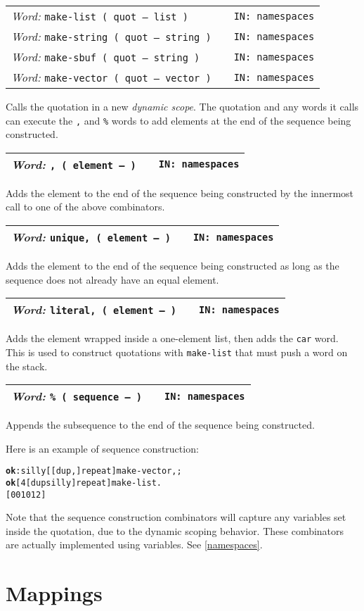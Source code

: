 \documentclass{report}
\newcommand{\tto}{\symbol{123}}
\newcommand{\ttc}{\symbol{125}}
\newcommand{\ordinaryword}[3]{\index{#1}
\emph{Word:} \texttt{#2} &&\texttt{IN: #3}}
\newcommand{\wordtable}[1]{

\begin{tabularx}{12cm}[t]{lXr}
\hline
#1\\
\hline
\end{tabularx}

}
\begin{document}
\newcommand{\dynamicscopeglos}{}
\dynamicscopeglos
\wordtable{
\ordinaryword{make-list}{make-list ( quot -- list )}{namespaces}\\
\ordinaryword{make-string}{make-string ( quot -- string )}{namespaces}\\
\ordinaryword{make-sbuf}{make-sbuf ( quot -- string )}{namespaces}\\
\ordinaryword{make-vector}{make-vector ( quot -- vector )}{namespaces}
}
Calls the quotation in a new \emph{dynamic scope}. The quotation and any words it calls can execute the \texttt{,} and \texttt{\%} words to add elements at the end of the sequence being constructed.
\wordtable{
\ordinaryword{,}{,~( element -- )}{namespaces}
}
Adds the element to the end of the sequence being constructed by the innermost call to one of the above combinators.
\wordtable{
\ordinaryword{unique,}{unique,~( element -- )}{namespaces}
}
Adds the element to the end of the sequence being constructed as long as the sequence does not already have an equal element.
\wordtable{
\ordinaryword{literal,}{literal,~( element -- )}{namespaces}
}
Adds the element wrapped inside a one-element list, then adds the \texttt{car} word. This is used to construct quotations with \texttt{make-list} that must push a word on the stack.
\wordtable{
\ordinaryword{\%}{\% ( sequence -- )}{namespaces}
}
Appends the subsequence to the end of the sequence being constructed.

Here is an example of sequence construction:
\begin{alltt}
\textbf{ok} : silly [ [ dup , ] repeat ] make-vector , ;
\textbf{ok} [ 4 [ dup silly ] repeat ] make-list .
[ \tto \ttc \tto 0 \ttc \tto 0 1 \ttc \tto 0 1 2 \ttc ]
\end{alltt}

Note that the sequence construction combinators will capture any variables set inside the quotation, due to the dynamic scoping behavior. These combinators are actually implemented using variables. See \ref{namespaces}.

\section{Mappings}

\end{document}
